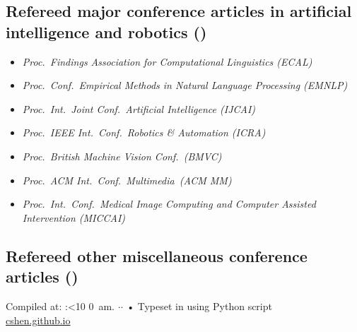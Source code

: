 \documentclass[9pt, a4paper]{article}
\newif\iftimePM
\def\now{\number\timehh:\ifnum\timemm<10 0\fi\number\timemm
         \iftimePM {$\,$pm.}  \else {$\,$am.}  \fi}
\edef\today{\number\day$\cdot$\number\month$\cdot$\number\year}
\begin{document}
\subsection*{Refereed major conference articles in artificial intelligence and robotics (\unskip)
}
{
\begin{itemize}
  \itemsep -.12cm
\footnotesize
\item \emph{  Proc.\ Findings Association for Computational Linguistics (ECAL)}    
\item \emph{  Proc.\ Conf.\ Empirical Methods in Natural Language Processing (EMNLP)}    
%
\item \emph{  Proc.\ Int.\ Joint Conf.\ Artificial Intelligence (IJCAI)}
\item \emph{  Proc.\ IEEE Int.\ Conf.\  Robotics \&  Automation (ICRA)}
\item \emph{  Proc.\ British Machine Vision Conf.\ (BMVC)}
\item \emph{  Proc.\ ACM Int.\  Conf.\  Multimedia\ (ACM MM)}
\item \emph{  Proc.\ Int.\ Conf.\ Medical Image Computing and Computer Assisted Intervention (MICCAI)}

\end{itemize}
}




\noindent






\vspace{-0.15cm}
\subsection*{Refereed other miscellaneous  conference articles (\unskip)}
\noindent







\vfill{}
\begin{center}
{\scriptsize    Compiled at: \now \today\- •\- Typeset in {
\XeLaTeX{}
using Python script
}\\
\href{https://cshen.github.io}{cshen.github.io}
}
\end{center}
\end{document}
